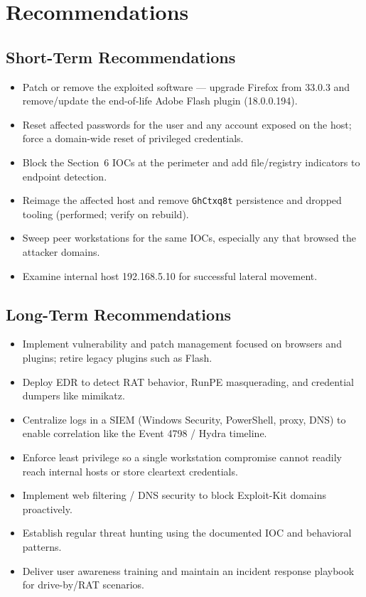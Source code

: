 \documentclass[12pt]{article}
\begin{document}
\section{Recommendations}

\subsection{Short-Term Recommendations}
\begin{itemize}
\item Patch or remove the exploited software --- upgrade Firefox from 33.0.3 and remove/update the end-of-life Adobe Flash plugin (18.0.0.194).
\item Reset affected passwords for the user and any account exposed on the host; force a domain-wide reset of privileged credentials.
\item Block the Section~6 IOCs at the perimeter and add file/registry indicators to endpoint detection.
\item Reimage the affected host and remove \texttt{GhCtxq8t} persistence and dropped tooling (performed; verify on rebuild).
\item Sweep peer workstations for the same IOCs, especially any that browsed the attacker domains.
\item Examine internal host 192.168.5.10 for successful lateral movement.
\end{itemize}

\subsection{Long-Term Recommendations}
\begin{itemize}
\item Implement vulnerability and patch management focused on browsers and plugins; retire legacy plugins such as Flash.
\item Deploy EDR to detect RAT behavior, RunPE masquerading, and credential dumpers like mimikatz.
\item Centralize logs in a SIEM (Windows Security, PowerShell, proxy, DNS) to enable correlation like the Event 4798 / Hydra timeline.
\item Enforce least privilege so a single workstation compromise cannot readily reach internal hosts or store cleartext credentials.
\item Implement web filtering / DNS security to block Exploit-Kit domains proactively.
\item Establish regular threat hunting using the documented IOC and behavioral patterns.
\item Deliver user awareness training and maintain an incident response playbook for drive-by/RAT scenarios.
\end{itemize}
\end{document}
